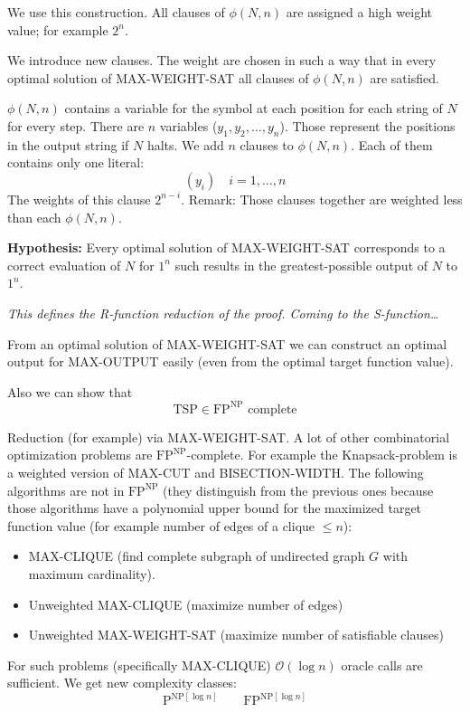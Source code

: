 \documentclass[a4paper]{article}
\begin{document}
We use this construction. All clauses of $\phi(N, n)$ are assigned a high weight value;
for example $2^n$.

We introduce new clauses.
The weight are chosen in such a way that in every optimal solution of MAX-WEIGHT-SAT
all clauses of $\phi(N, n)$ are satisfied.

$\phi(N, n)$ contains a variable for the symbol at each position for each string
of $N$ for every step.
There are $n$ variables ($y_1, y_2, \ldots, y_n$).
Those represent the positions in the output string if $N$ halts.
We add $n$ clauses to $\phi(N, n)$. Each of them contains only one literal:
\[
  (y_i) \quad i = 1, \ldots, n
\]
The weights of this clause $2^{n-i}$. Remark: Those clauses together are weighted
less than each $\phi(N, n)$.

\textbf{Hypothesis:} Every optimal solution of MAX-WEIGHT-SAT corresponds to a correct
evaluation of $N$ for $1^n$ such results in the greatest-possible output of $N$
to $1^n$.

\emph{This defines the R-function reduction of the proof. Coming to the S-function\dots}

From an optimal solution of MAX-WEIGHT-SAT we can construct an optimal output
for MAX-OUTPUT easily (even from the optimal target function value).

Also we can show that
\[
  \text{TSP} \in \text{FP}^{\text{NP}} \text{ complete}
\]

Reduction (for example) via MAX-WEIGHT-SAT. A lot of other combinatorial optimization
problems are $\text{FP}^{\text{NP}}$-complete. For example the Knapsack-problem is
a weighted version of MAX-CUT and BISECTION-WIDTH. The following algorithms are not
in $\text{FP}^{\text{NP}}$ (they distinguish from the previous ones because those algorithms
have a polynomial upper bound for the maximized target function value (for example number of
edges of a clique $\leq n$):
\begin{itemize}
  \item MAX-CLIQUE (find complete subgraph of undirected graph $G$ with maximum cardinality).
  \item Unweighted MAX-CLIQUE (maximize number of edges)
  \item Unweighted MAX-WEIGHT-SAT (maximize number of satisfiable clauses)
\end{itemize}

For such problems (specifically MAX-CLIQUE) $\mathcal{O}(\log{n})$ oracle calls
are sufficient. We get new complexity classes:
\[
  \text{P}^{\text{NP} [\log{n}]}   \qquad  \text{FP}^{\text{NP} [\log{n}]}
\]
\end{document}
